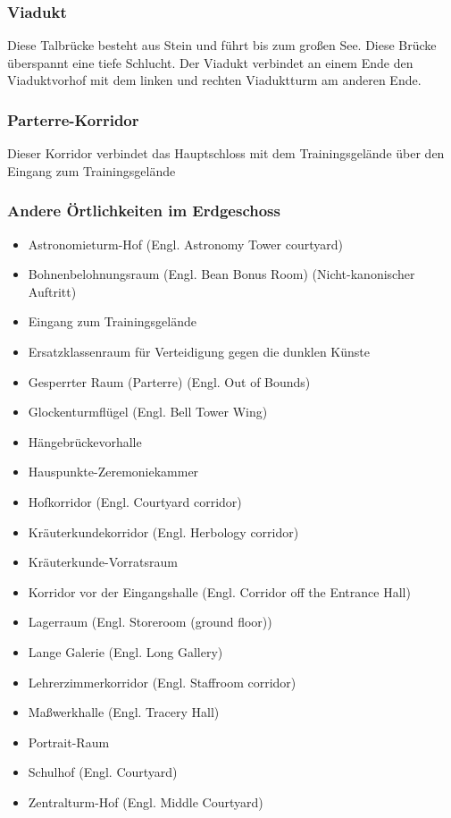 \documentclass[a4paper, 10pt]{article}
\begin{document}
\subsubsection*{\large Viadukt}
Diese Talbrücke besteht aus Stein und führt bis zum großen See. Diese Brücke überspannt eine tiefe Schlucht. Der Viadukt verbindet an einem Ende den Viaduktvorhof mit dem linken und rechten Viaduktturm am anderen Ende.
\subsubsection*{\large Parterre-Korridor}
Dieser Korridor verbindet das Hauptschloss mit dem Trainingsgelände über den Eingang zum Trainingsgelände

\subsubsection*{\large Andere Örtlichkeiten im Erdgeschoss}
\vspace{10pt}
\begin{itemize}
    \item Astronomieturm-Hof (Engl. Astronomy Tower courtyard)
    \item Bohnenbelohnungsraum (Engl. Bean Bonus Room) (Nicht-kanonischer Auftritt)
    \item Eingang zum Trainingsgelände
    \item Ersatzklassenraum für Verteidigung gegen die dunklen Künste
    \item Gesperrter Raum (Parterre) (Engl. Out of Bounds)
    \item Glockenturmflügel (Engl. Bell Tower Wing)
    \item Hängebrückevorhalle
    \item Hauspunkte-Zeremoniekammer
    \item Hofkorridor (Engl. Courtyard corridor)
    \item Kräuterkundekorridor (Engl. Herbology corridor)
    \item Kräuterkunde-Vorratsraum
    \item Korridor vor der Eingangshalle (Engl. Corridor off the Entrance Hall)
    \item Lagerraum (Engl. Storeroom (ground floor))
    \item Lange Galerie (Engl. Long Gallery)
    \item Lehrerzimmerkorridor (Engl. Staffroom corridor)
    \item Maßwerkhalle (Engl. Tracery Hall)
    \item Portrait-Raum
    \item Schulhof (Engl. Courtyard)
    \item Zentralturm-Hof (Engl. Middle Courtyard)
\end{itemize}
\end{document}
